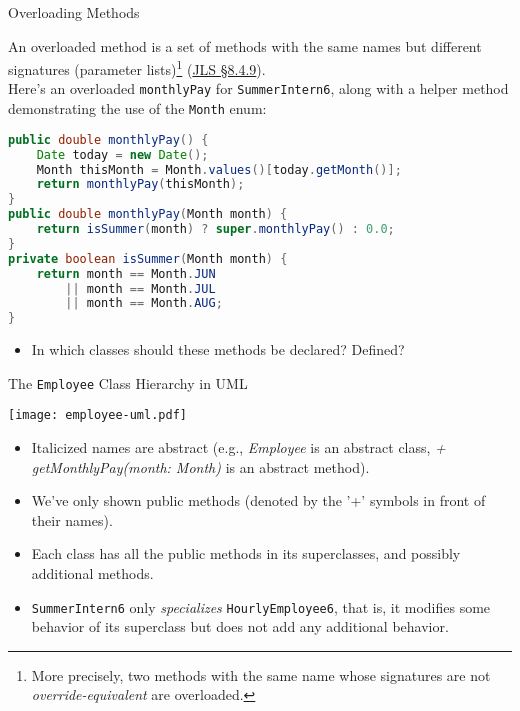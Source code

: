 \documentclass{beamer}
\begin{document}
\begin{frame}[fragile]{Overloading Methods}


An overloaded method is a set of methods with the same names but different signatures (parameter lists)\footnote{More precisely, two methods with the same name whose signatures are not {\it override-equivalent} are overloaded.} (\href{http://docs.oracle.com/javase/specs/jls/se7/html/jls-8.html#jls-8.4.9}{JLS \S 8.4.9}).\\
\vspace{.075in}
Here's an overloaded {\tt monthlyPay} for {\tt SummerIntern6}, along with a helper method demonstrating the use of the {\tt Month} enum:
\begin{lstlisting}[language=Java]
public double monthlyPay() {
    Date today = new Date();
    Month thisMonth = Month.values()[today.getMonth()];
    return monthlyPay(thisMonth);
}
public double monthlyPay(Month month) {
    return isSummer(month) ? super.monthlyPay() : 0.0;
}
private boolean isSummer(Month month) {
    return month == Month.JUN 
        || month == Month.JUL 
        || month == Month.AUG;
}
\end{lstlisting}
\vspace{-.075in}
\begin{itemize}
\item In which classes should these methods be declared? Defined?
\end{itemize}


\end{frame}

\begin{frame}[fragile]{The {\tt Employee} Class Hierarchy in UML}


\vspace{-.2in}
\begin{center}
\texttt{[image: employee-uml.pdf]}
\end{center}
\vspace{-.25in}
\begin{itemize}
\item Italicized names are abstract (e.g., {\it Employee} is an abstract class, {\it + getMonthlyPay(month: Month)} is an abstract method).
\item We've only shown public methods (denoted by the '+' symbols in front of their names).
\item Each class has all the public methods in its superclasses, and possibly additional methods.
\item {\tt SummerIntern6} only {\it specializes} {\tt HourlyEmployee6}, that is, it modifies some behavior of its superclass but does not add any additional behavior. 
\end{itemize}


\end{frame}
\end{document}
